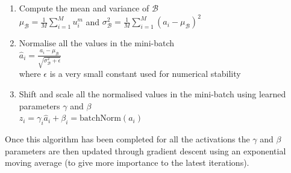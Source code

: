{{\begin{enumerate}
    \item Compute the mean and variance of $\mathcal{B}$\\
    $\mu_\mathcal{B} = \frac{1}{M} \sum_{i=1}^{M} u_i^m$ 
    \+ \+ \+ and \+ \+ \+
    $\sigma_\mathcal{B}^2 = \frac{1}{M}\sum_{i=1}^M (a_i - \mu_\mathcal{B})^2$
    \item Normalise all the values in the mini-batch\\
    $\hat a_i = \frac{a_i - \mu_\mathcal{B}}{\sqrt{\sigma_\mathcal{B}^2 + \epsilon}}$\\
    where $\epsilon$ is a very small constant used for numerical stability
    \item Shift and scale all the normalised values in the mini-batch using learned parameters $\gamma$ and $\beta$\\
    $z_i = \gamma_i \hat a_i + \beta_i = \text{batchNorm}(a_i)$
\end{enumerate}

Once this algorithm has been completed for all the activations the $\gamma$ and $\beta$ parameters are then updated through gradient descent using an exponential moving average (to give more importance to the latest iterations).

}}
